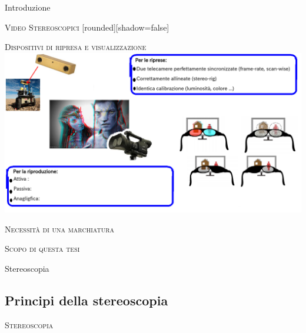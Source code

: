 \documentclass{beamer}
\begin{document}
\begin{section}{Introduzione}
\begin{frame}[t]{\textsc{Video Stereoscopici}}
	[rounded][shadow=false]
\begin{block}
\centering

\end{block}
\end{frame}


\begin{frame}[t]{\textsc{Dispositivi di ripresa e visualizzazione}}
	\vspace{1em}
\centering
\includegraphics[width=1\linewidth]{./img/mah.png}
\end{frame}

\begin{frame}[t]{\textsc{Necessit\`{a} di una marchiatura}}

\end{frame}


\begin{frame}[t]{\textsc{Scopo di questa tesi}}

\end{frame}

\end{section}

\begin{section}{Stereoscopia}
\subsection{Principi della stereoscopia}
\begin{frame}[t]{\textsc{Stereoscopia}}

\end{frame}

\end{section}
\end{document}
